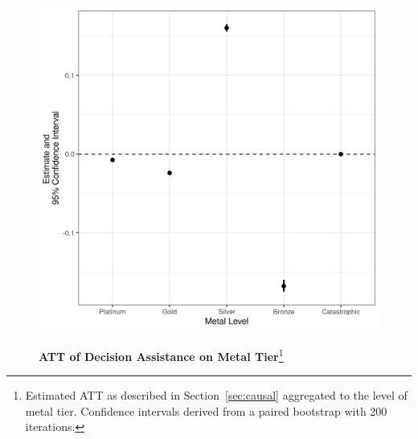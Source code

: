 \documentclass[12pt]{article}
\begin{document}
\newpage
\begin{figure}[htb]
\centering
\footnotesize
\begin{minipage}[h]{6in}
\caption[caption]{\textbf{ATT of Decision Assistance on Metal Tier}\footnote{Estimated ATT as described in Section~\ref{sec:causal} aggregated to the level of metal tier. Confidence intervals derived from a paired bootstrap with 200 iterations.}}
\centerline{%
    \includegraphics[scale=0.75]{figures/choice_metals.png}
}
\label{fig:choice-metal}
\end{minipage}
\end{figure}
\end{document}

